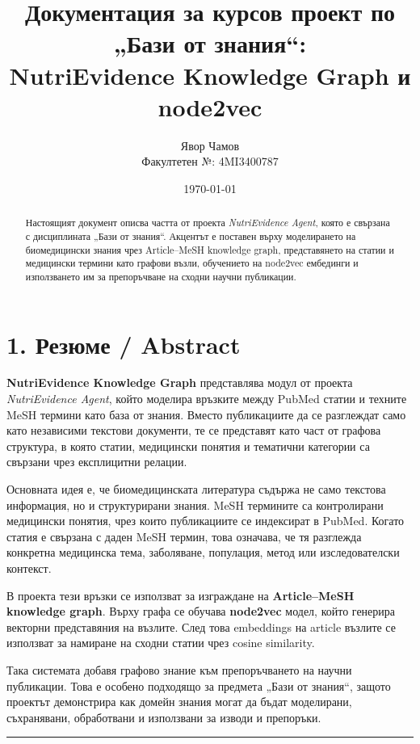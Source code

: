 \documentclass[12pt,a4paper]{article}
\title{\textbf{Документация за курсов проект по „Бази от знания“:\\ NutriEvidence Knowledge Graph и node2vec}}
\author{
Явор Чамов\\
\small{Факултетен №: 4MI3400787}\\[0.5em]
}
\date{\today}
\begin{document}
\maketitle

\begin{abstract}
Настоящият документ описва частта от проекта \textit{NutriEvidence Agent}, която е свързана с дисциплината „Бази от знания“. Акцентът е поставен върху моделирането на биомедицински знания чрез Article--MeSH knowledge graph, представянето на статии и медицински термини като графови възли, обучението на node2vec ембединги и използването им за препоръчване на сходни научни публикации.
\end{abstract}

\tableofcontents
\newpage

\section{1. Резюме / Abstract}

\textbf{NutriEvidence Knowledge Graph} представлява модул от проекта \textit{NutriEvidence Agent}, който моделира връзките между PubMed статии и техните MeSH термини като база от знания. Вместо публикациите да се разглеждат само като независими текстови документи, те се представят като част от графова структура, в която статии, медицински понятия и тематични категории са свързани чрез експлицитни релации.

Основната идея е, че биомедицинската литература съдържа не само текстова информация, но и структурирани знания. MeSH термините са контролирани медицински понятия, чрез които публикациите се индексират в PubMed. Когато статия е свързана с даден MeSH термин, това означава, че тя разглежда конкретна медицинска тема, заболяване, популация, метод или изследователски контекст.

В проекта тези връзки се използват за изграждане на \textbf{Article--MeSH knowledge graph}. Върху графа се обучава \textbf{node2vec} модел, който генерира векторни представяния на възлите. След това embeddings на article възлите се използват за намиране на сходни статии чрез cosine similarity.

Така системата добавя графово знание към препоръчването на научни публикации. Това е особено подходящо за предмета „Бази от знания“, защото проектът демонстрира как домейн знания могат да бъдат моделирани, съхранявани, обработвани и използвани за изводи и препоръки.

\vspace{0.5em}\hrule\vspace{1.0em}
\end{document}
